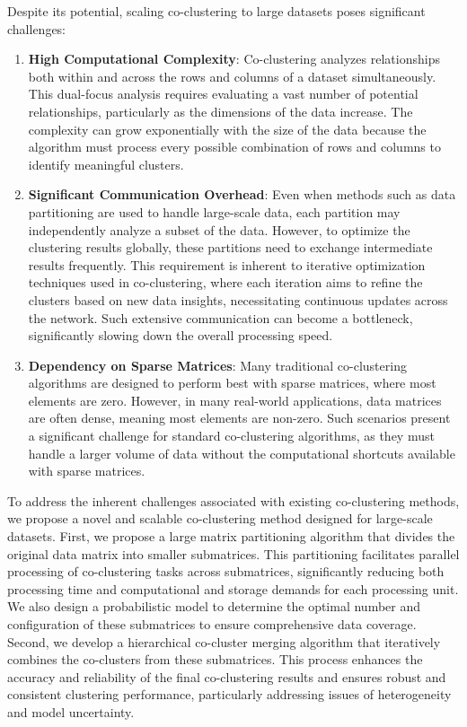 Despite its potential, scaling co-clustering to large datasets poses significant challenges:
\begin{enumerate}
    \item \textbf{High Computational Complexity}: Co-clustering analyzes relationships both within and across the rows and columns of a dataset simultaneously. This dual-focus analysis requires evaluating a vast number of potential relationships, particularly as the dimensions of the data increase. The complexity can grow exponentially with the size of the data because the algorithm must process every possible combination of rows and columns to identify meaningful clusters.  
    \item \textbf{Significant Communication Overhead}: Even when methods such as data partitioning are used to handle large-scale data, each partition may independently analyze a subset of the data. However, to optimize the clustering results globally, these partitions need to exchange intermediate results frequently. This requirement is inherent to iterative optimization techniques used in co-clustering, where each iteration aims to refine the clusters based on new data insights, necessitating continuous updates across the network. Such extensive communication can become a bottleneck, significantly slowing down the overall processing speed.
   \item \textbf{Dependency on Sparse Matrices}: Many traditional co-clustering algorithms are designed to perform best with sparse matrices, where most elements are zero. However, in many real-world applications, data matrices are often dense, meaning most elements are non-zero. Such scenarios present a significant challenge for standard co-clustering algorithms, as they must handle a larger volume of data without the computational shortcuts available with sparse matrices.
\end{enumerate}

To address the inherent challenges associated with existing co-clustering methods, we propose a novel and scalable co-clustering method designed for large-scale datasets. First,  we propose a large matrix partitioning algorithm that divides the original data matrix into smaller submatrices. This partitioning facilitates parallel processing of co-clustering tasks across submatrices, significantly reducing both processing time and computational and storage demands for each processing unit. We also design a probabilistic model to determine the optimal number and configuration of these submatrices to ensure comprehensive data coverage.
Second, we develop a hierarchical co-cluster merging algorithm that iteratively combines the co-clusters from these submatrices. This process enhances the accuracy and reliability of the final co-clustering results and ensures robust and consistent clustering performance, particularly addressing issues of heterogeneity and model uncertainty.

